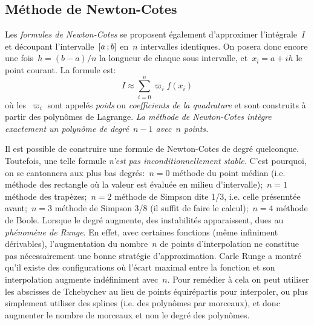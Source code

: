 \subsection*{Méthode de Newton-Cotes} 
Les \emph{formules de Newton-Cotes} se proposent également d'approximer l'intégrale~$I$ et découpant l'intervalle~$\mathopen{[}a\,;b\mathclose{]}$ en~$n$ intervalles identiques. On posera donc encore une fois~$h=(b-a)/n$ la longueur de chaque sous intervalle, et~$x_i=a+ih$ le point courant. La formule est: 
\begin{equation}
 I\approx \sum_{i=0}^n \varpi_i f(x_i) 
\end{equation}
où les~$\varpi_i$ sont appelés \emph{poids} ou \emph{coefficients de la quadrature} et sont construits à partir des polynômes de Lagrange. \emph{La méthode de Newton-Cotes intègre exactement un polynôme de degré~$n-1$ avec~$n$ points.} 

\begin{remarque} Il est possible de construire une formule de Newton-Cotes de degré quelconque. Toutefois, une telle formule \emph{n'est pas inconditionnellement stable.} C'est pourquoi, on se cantonnera aux plus bas degrés:~$n=0$ méthode du point médian (i.e. méthode des rectangle où la valeur est évaluée en milieu d'intervalle);~$n=1$ méthode des trapèzes;~$n=2$ méthode de Simpson dite 1/3, i.e. celle présenntée avant;~$n=3$ méthode de Simpson 3/8 (il suffit de faire le calcul);~$n=4$ méthode de Boole. Lorsque le degré augmente, des instabilités apparaissent, dues au \emph{phénomène de Runge}. En effet, avec certaines fonctions (même infiniment dérivables), l'augmentation du nombre~$n$ de points d'interpolation ne constitue pas nécessairement une bonne stratégie d'approximation. Carle Runge a montré qu'il existe des configurations où l'écart maximal entre la fonction et son interpolation augmente indéfiniment avec~$n$. Pour remédier à cela on peut utiliser les abscisses de Tchebychev au lieu de points équirépartis pour interpoler, ou plus simplement utiliser des splines (i.e. des polynômes par morceaux), et donc augmenter le nombre de morceaux et non le degré des polynômes. 
\end{remarque} 
